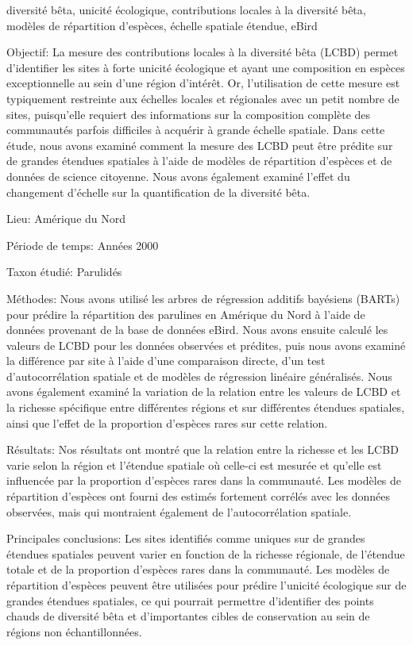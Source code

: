 \documentclass[12pt,twoside,maitrise]{template/dms}
\begin{document}
\begin{resume}{diversité bêta, unicité écologique, contributions locales à la diversité bêta, modèles de répartition d'espèces, échelle spatiale étendue, eBird}
  
  Objectif: La mesure des contributions locales à la diversité bêta (LCBD) permet d'identifier les sites à forte unicité écologique et ayant une composition en espèces exceptionnelle au sein d'une région d'intérêt. Or, l'utilisation de cette mesure est typiquement restreinte aux échelles locales et régionales avec un petit nombre de sites, puisqu'elle requiert des informations sur la composition complète des communautés parfois difficiles à acquérir à grande échelle spatiale. Dans cette étude, nous avons examiné comment la mesure des LCBD peut être prédite sur de grandes étendues spatiales à l'aide de modèles de répartition d'espèces et de données de science citoyenne. Nous avons également examiné l'effet du changement d'échelle sur la quantification de la diversité bêta.

  Lieu: Amérique du Nord
  
  Période de temps: Années 2000
  
  Taxon étudié: Parulidés
  
  Méthodes: Nous avons utilisé les arbres de régression additifs bayésiens (BARTs) pour prédire la répartition des parulines en Amérique du Nord à l'aide de données provenant de la base de données eBird. Nous avons ensuite calculé les valeurs de LCBD pour les données observées et prédites, puis nous avons examiné la différence par site à l'aide d'une comparaison directe, d'un test d'autocorrélation spatiale et de modèles de régression linéaire généralisés. Nous avons également examiné la variation de la relation entre les valeurs de LCBD et la richesse spécifique entre différentes régions et sur différentes étendues spatiales, ainsi que l'effet de la proportion d'espèces rares sur cette relation.
  
  Résultats: Nos résultats ont montré que la relation entre la richesse et les LCBD varie selon la région et l'étendue spatiale où celle-ci est mesurée et qu'elle est influencée par la proportion d'espèces rares dans la communauté. Les modèles de répartition d'espèces ont fourni des estimés fortement corrélés avec les données observées, mais qui montraient également de l'autocorrélation spatiale.
  
  Principales conclusions: Les sites identifiés comme uniques sur de grandes étendues spatiales peuvent varier en fonction de la richesse régionale, de l'étendue totale et de la proportion d'espèces rares dans la communauté. Les modèles de répartition d'espèces peuvent être utilisées pour prédire l'unicité écologique sur de grandes étendues spatiales, ce qui pourrait permettre d'identifier des points chauds de diversité bêta et d'importantes cibles de conservation au sein de régions non échantillonnées.

\end{resume}
\end{document}
